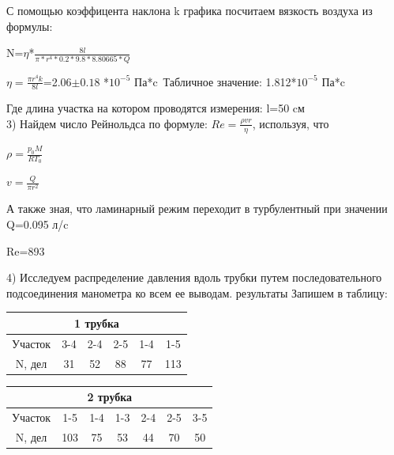 \documentclass[a4paper,12pt]{article} %
\begin{document}
С помощью коэффицента наклона k графика посчитаем вязкость воздуха из формулы:

N=$\eta$*$\frac{8l}{\pi*r^{4}*0.2*9.8*8.80665*Q}$

$\eta = \frac{\pi r^4  k}{8l}$=2.06$\pm0.18$ *$10^{-5}$ Па*c\
Табличное значение: 1.812*$10^{-5}$ Па*c


Где длина участка на котором проводятся измерения:
l=50 cм \\

3) Найдем число Рейнольдса по формуле:  $Re=\frac{\rho v r}{\eta}$, используя, что

 $\rho=\frac{p_0 M}{R T_0}$
 
$v=\frac{Q}{\pi r^{2}}$

А также зная, что ламинарный режим переходит в турбулентный при значении Q=0.095 л/c

Re=893




















4) Исследуем распределение давления вдоль трубки путем последовательного подсоединения манометра ко всем ее выводам. результаты Запишем в таблицу:\\

\begin{tabular}{|c|c|c|c|c|c|}
\hline 
\multicolumn{6}{|c|}{1 трубка}\\ 
\hline 
\hline 
Участок & 3-4 & 2-4 & 2-5 & 1-4 & 1-5 \\ 
\hline 
N, дел & 31 & 52 & 88 & 77 & 113 \\ 
\hline 
\end{tabular} 
\begin{tabular}{|c|c|c|c|c|c|c|}
\hline 
\multicolumn{7}{|c|}{2 трубка}\\ 
\hline 
\hline 
Участок & 1-5 & 1-4 & 1-3 & 2-4 & 2-5 & 3-5 \\ 
\hline 
N, дел & 103 & 75 & 53 & 44 & 70 & 50 \\ 
\hline 
\end{tabular} 
\end{document}
